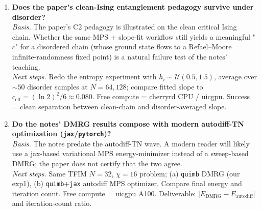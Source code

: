 \begin{enumerate}
  \item \textbf{Does the paper's clean-Ising entanglement pedagogy survive under disorder?}\\
        \emph{Basis.} The paper's C2 pedagogy is illustrated on the clean critical Ising chain. Whether the same MPS + slope-fit
        workflow still yields a meaningful "$c$" for a disordered chain (whose ground state flows to a Refael--Moore infinite-randomness
        fixed point) is a natural failure test of the notes' teaching.\\
        \emph{Next steps.} Redo the entropy experiment with $h_i \sim \mathcal{U}(0.5, 1.5)$, average over $\sim 50$ disorder samples at $N=64, 128$;
        compare fitted slope to $c_\text{eff} = (\ln 2)^2/6 \approx 0.080$. Free compute = cherryrd CPU / uicgpu.
        Success = clean separation between clean-chain and disorder-averaged slope.

  \item \textbf{Do the notes' DMRG results compose with modern autodiff-TN optimization (\texttt{jax}/\texttt{pytorch})?}\\
        \emph{Basis.} The notes predate the autodiff-TN wave. A modern reader will likely use a jax-based variational MPS energy-minimizer
        instead of a sweep-based DMRG; the paper does not certify that the two agree.\\
        \emph{Next steps.} Same TFIM $N{=}32$, $\chi{=}16$ problem; (a) \texttt{quimb} DMRG (our exp1), (b) \texttt{quimb}+\texttt{jax}
        autodiff MPS optimizer. Compare final energy and iteration count. Free compute = uicgpu A100. Deliverable: $|E_\text{DMRG} - E_\text{autodiff}|$
        and iteration-count ratio.
\end{enumerate}
